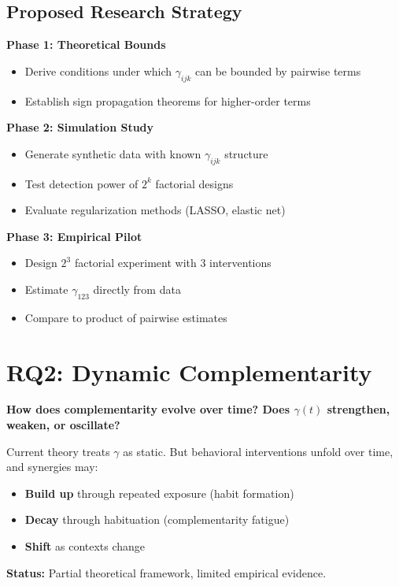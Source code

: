 \subsection{Proposed Research Strategy}

\begin{tcolorbox}[colback=green!5!white,colframe=green!75!black,title=\textbf{Research Protocol for RQ1}]
\textbf{Phase 1: Theoretical Bounds}
\begin{itemize}[noitemsep]
    \item Derive conditions under which $\gamma_{ijk}$ can be bounded by pairwise terms
    \item Establish sign propagation theorems for higher-order terms
\end{itemize}

\textbf{Phase 2: Simulation Study}
\begin{itemize}[noitemsep]
    \item Generate synthetic data with known $\gamma_{ijk}$ structure
    \item Test detection power of $2^k$ factorial designs
    \item Evaluate regularization methods (LASSO, elastic net)
\end{itemize}

\textbf{Phase 3: Empirical Pilot}
\begin{itemize}[noitemsep]
    \item Design $2^3$ factorial experiment with 3 interventions
    \item Estimate $\gamma_{123}$ directly from data
    \item Compare to product of pairwise estimates
\end{itemize}
\end{tcolorbox}

\section{RQ2: Dynamic Complementarity}
\label{sec:rq2-dynamic}

\begin{tcolorbox}[colback=red!5!white,colframe=red!75!black,title=\textbf{Research Question 2}]
\textbf{How does complementarity evolve over time? Does $\gamma(t)$ strengthen, weaken, or oscillate?}

Current theory treats $\gamma$ as static. But behavioral interventions unfold over time, and synergies may:
\begin{itemize}[noitemsep]
    \item \textbf{Build up} through repeated exposure (habit formation)
    \item \textbf{Decay} through habituation (complementarity fatigue)
    \item \textbf{Shift} as contexts change
\end{itemize}

\textbf{Status:} Partial theoretical framework, limited empirical evidence.
\end{tcolorbox}

